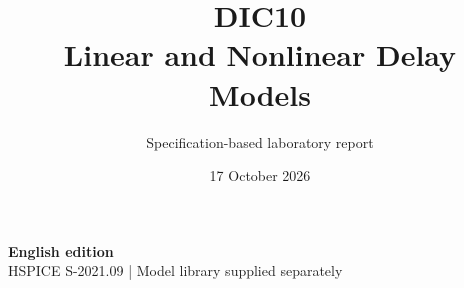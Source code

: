 \documentclass[11pt,a4paper]{article}
\title{\color{accent}DIC10\\[4pt]Linear and Nonlinear Delay Models}
\author{Specification-based laboratory report}
\date{17 October 2026}
\begin{document}
\maketitle
\begin{center}\small\textbf{English edition}\\
HSPICE S-2021.09 \quad | \quad Model library supplied separately
\end{center}


\end{document}
